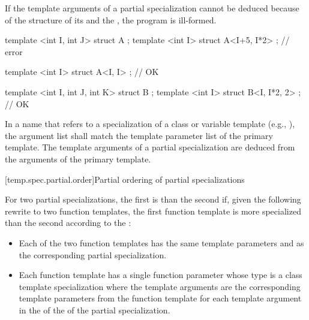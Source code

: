 \pnum
If the template arguments of a partial specialization cannot be deduced
because of the structure of its 
and the ,
the program is ill-formed.
\begin{example}
\begin{codeblock}
template <int I, int J> struct A {};
template <int I> struct A<I+5, I*2> {};     // error

template <int I> struct A<I, I> {};         // OK

template <int I, int J, int K> struct B {};
template <int I> struct B<I, I*2, 2> {};    // OK
\end{codeblock}
\end{example}

\pnum
In a name that refers to a specialization of a class or variable template
(e.g., ),
the argument list shall match the template parameter list of the primary
template.
The template arguments of a partial specialization are deduced from the arguments
of the primary template.

[temp.spec.partial.order]{Partial ordering of partial specializations}

\pnum
{}%
For two partial specializations,
the first is  than the second if, given the following
rewrite to two function templates, the first function template is more
specialized than the second according to the :
\begin{itemize}
\item
Each of the two
function templates has the same template parameters
and 
as the corresponding partial specialization.
\item
Each function template
has a single function parameter
whose type is a class template specialization where the template arguments
are the corresponding template parameters from the function template
for each template argument
in the 
of the 
of the partial specialization.
\end{itemize}

